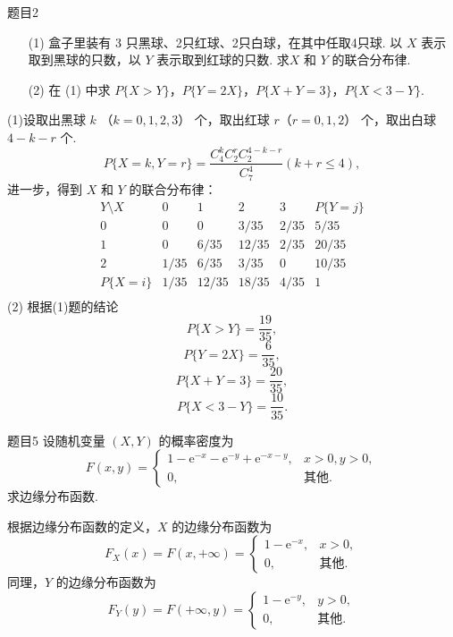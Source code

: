 \begin{question}{题目2}
    \begin{itemize}
        \item [(1)] 盒子里装有 3 只黑球、2只红球、2只白球，在其中任取4只球. 以 $X$ 表示取到黑球的只数，以 $Y$ 表示取到红球的只数. 求$X$ 和 $Y$ 的联合分布律.
        \item [(2)] 在 (1) 中求 $P\{X>Y\}$，$P\{Y=2X\}$，$P\{X+Y=3\}$，$P\{X<3-Y\}$.
    \end{itemize}
\end{question}
\begin{solution}
    (1)设取出黑球 $k$ （$k=0,1,2,3$） 个，取出红球 $r$（$r=0,1,2$） 个，取出白球 $4-k-r$ 个.
    $$
        P\{X=k, Y=r\} = \frac{C_4^kC_2^rC_2^{4-k-r}}{C_7^4}
        (k + r \leqslant 4),
    $$
    进一步，得到 $X$ 和 $Y$ 的联合分布律：
    $$
        \begin{array}{c|cccc|c}
            Y \setminus X & 0    & 1     & 2     & 3    & P\{Y=j\} \\
            \hline
            0             & 0    & 0     & 3/35  & 2/35 & 5/35     \\
            1             & 0    & 6/35  & 12/35 & 2/35 & 20/35    \\
            2             & 1/35 & 6/35  & 3/35  & 0    & 10/35    \\
            \hline
            P\{X=i\}      & 1/35 & 12/35 & 18/35 & 4/35 & 1        \\
        \end{array}
    $$
    (2) 根据(1)题的结论
    $$
        P\{X>Y\} = \frac{19}{35},
    $$
    $$
        P\{Y=2X\} = \frac{6}{35},
    $$
    $$
        P\{X+Y=3\} = \frac{20}{35},
    $$
    $$
        P\{X<3-Y\} = \frac{10}{35}.
    $$
\end{solution}

\begin{question}{题目5}
    设随机变量 $(X,Y)$ 的概率密度为
    $$
        F(x,y) = \begin{cases}
            1-\mathrm{e}^{-x}-\mathrm{e}^{-y}+\mathrm{e}^{-x-y}, & x>0,y>0,     \\
            0,                                                   & \text{其他}.
        \end{cases}
    $$
    求边缘分布函数.
\end{question}
\begin{solution}
    根据边缘分布函数的定义，$X$ 的边缘分布函数为
    $$
        F_X(x) = F(x, +\infty) =
        \begin{cases}
            1 - \mathrm{e}^{-x}, & x>0,         \\
            0,                   & \text{其他}.
        \end{cases}
    $$
    同理，$Y$ 的边缘分布函数为
    $$
        F_Y(y) = F(+\infty, y) =
        \begin{cases}
            1 - \mathrm{e}^{-y}, & y>0,         \\
            0,                   & \text{其他}.
        \end{cases}
    $$
\end{solution}



